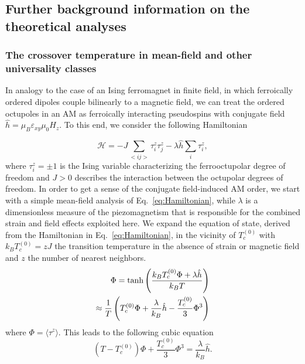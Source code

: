 \documentclass[
 reprint,










 amsmath,amssymb,
 aps,






]{revtex4-2}
\begin{document}
\newpage
\clearpage

\setcounter{figure}{0}
\renewcommand{\thefigure}{S\arabic{figure}}
\setcounter{equation}{0}
\renewcommand{\theequation}{S\arabic{equation}}

\pagestyle{empty}



\subsection{Further background information on the theoretical analyses}

\subsubsection{The crossover temperature in mean-field and other universality classes}
\label{sec:crossover-theory}

In analogy to the case of an Ising ferromagnet in finite field, in which ferroically ordered dipoles couple bilinearly to a magnetic field, we can treat the  ordered octupoles in an AM as ferroically interacting pseudospins with conjugate field $\hat{h}=\mu_B\varepsilon_{xy} \mu_0H_z$. To this end, we consider the following Hamiltonian

\begin{equation}
    \mathcal{H}=-J\sum_{<ij>}\tau_i^z\tau_j^z -\lambda \hat{h} \sum_i\tau_i^z,
    \label{eq:Hamiltonian}
\end{equation}
where $\tau^z_i = \pm 1$ is the Ising variable characterizing the ferrooctupolar degree of freedom and $J>0$ describes the interaction between the octupolar degrees of freedom. In order to get a sense of the conjugate field-induced AM order, we start with a simple mean-field analysis of Eq.~\eqref{eq:Hamiltonian}, while $\lambda$ is a dimensionless measure of the piezomagnetism that is responsible for the combined strain and field effects exploited here.
We expand the equation of state, derived from the Hamiltonian in Eq.~\eqref{eq:Hamiltonian}, in the vicinity of $T_c^{(0)}$ with $k_BT_c^{(0)}=zJ$ the transition temperature in the absence of strain or magnetic field and $z$ the number of nearest neighbors.
\begin{align}
    \Phi=\textnormal{tanh}\left(\frac{k_BT_c^{(0)}\Phi+\lambda \hat{h}}{k_BT}\right)\nonumber \\
     \approx \frac{1}{T}\left(T_c^{(0)}\Phi+\frac{\lambda}{k_B}\hat{h}-\frac{T_c^{(0)}}{3}\Phi^3\right)
\end{align}
where $\Phi=\langle\tau^z\rangle$. This leads to the following cubic equation
\begin{equation}
    (T-T_c^{(0)})\Phi+\frac{T_c^{(0)}}{3}\Phi^3=\frac{\lambda}{k_B}\hat{h}.
    \label{eq:eos_mf}
\end{equation}
\end{document}
